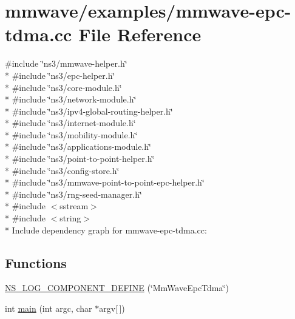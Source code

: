 \hypertarget{mmwave-epc-tdma_8cc}{}\section{mmwave/examples/mmwave-\/epc-\/tdma.cc File Reference}
\label{mmwave-epc-tdma_8cc}
{\ttfamily \#include \char`\"{}ns3/mmwave-\/helper.\+h\char`\"{}}\\*
{\ttfamily \#include \char`\"{}ns3/epc-\/helper.\+h\char`\"{}}\\*
{\ttfamily \#include \char`\"{}ns3/core-\/module.\+h\char`\"{}}\\*
{\ttfamily \#include \char`\"{}ns3/network-\/module.\+h\char`\"{}}\\*
{\ttfamily \#include \char`\"{}ns3/ipv4-\/global-\/routing-\/helper.\+h\char`\"{}}\\*
{\ttfamily \#include \char`\"{}ns3/internet-\/module.\+h\char`\"{}}\\*
{\ttfamily \#include \char`\"{}ns3/mobility-\/module.\+h\char`\"{}}\\*
{\ttfamily \#include \char`\"{}ns3/applications-\/module.\+h\char`\"{}}\\*
{\ttfamily \#include \char`\"{}ns3/point-\/to-\/point-\/helper.\+h\char`\"{}}\\*
{\ttfamily \#include \char`\"{}ns3/config-\/store.\+h\char`\"{}}\\*
{\ttfamily \#include \char`\"{}ns3/mmwave-\/point-\/to-\/point-\/epc-\/helper.\+h\char`\"{}}\\*
{\ttfamily \#include \char`\"{}ns3/rng-\/seed-\/manager.\+h\char`\"{}}\\*
{\ttfamily \#include $<$sstream$>$}\\*
{\ttfamily \#include $<$string$>$}\\*
Include dependency graph for mmwave-\/epc-\/tdma.cc\+:
\subsection*{Functions}
\begin{DoxyCompactItemize}
\item 
\hyperlink{mmwave-epc-tdma_8cc_a4b6e3fef4d253f684454852e5c4d3396}{N\+S\+\_\+\+L\+O\+G\+\_\+\+C\+O\+M\+P\+O\+N\+E\+N\+T\+\_\+\+D\+E\+F\+I\+NE} (\char`\"{}Mm\+Wave\+Epc\+Tdma\char`\"{})
\item 
int \hyperlink{mmwave-epc-tdma_8cc_a0ddf1224851353fc92bfbff6f499fa97}{main} (int argc, char $\ast$argv\mbox{[}$\,$\mbox{]})
\end{DoxyCompactItemize}


